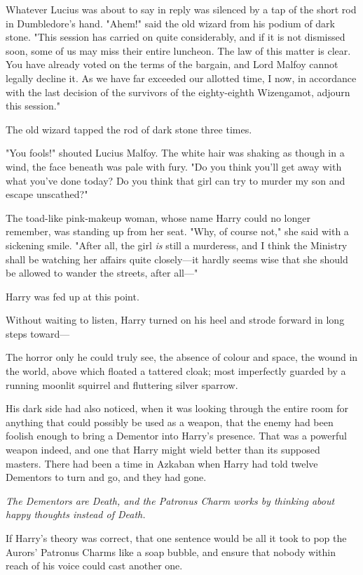 Whatever Lucius was about to say in reply was silenced by a tap of the short
rod in Dumbledore's hand. "Ahem!" said the old wizard from his podium of dark
stone. "This session has carried on quite considerably, and if it is not
dismissed soon, some of us may miss their entire luncheon. The law of this
matter is clear. You have already voted on the terms of the bargain, and Lord
Malfoy cannot legally decline it. As we have far exceeded our allotted time, I
now, in accordance with the last decision of the survivors of the eighty-eighth
Wizengamot, adjourn this session."

The old wizard tapped the rod of dark stone three times.

"You fools!" shouted Lucius Malfoy. The white hair was shaking as though in a
wind, the face beneath was pale with fury. "Do you think you'll get away with
what you've done today? Do you think that girl can try to murder my son and
escape unscathed?"

The toad-like pink-makeup woman, whose name Harry could no longer remember, was
standing up from her seat. "Why, of course not," she said with a sickening
smile. "After all, the girl \emph{is} still a murderess, and I think the
Ministry shall be watching her affairs quite closely—it hardly seems wise
that she should be allowed to wander the streets, after all—"

Harry was fed up at this point.

Without waiting to listen, Harry turned on his heel and strode forward in long
steps toward—

The horror only he could truly see, the absence of colour and space, the wound
in the world, above which floated a tattered cloak; most imperfectly guarded by
a running moonlit squirrel and fluttering silver sparrow.

His dark side had also noticed, when it was looking through the entire room for
anything that could possibly be used as a weapon, that the enemy had been
foolish enough to bring a Dementor into Harry's presence. That was a powerful
weapon indeed, and one that Harry might wield better than its supposed masters.
There had been a time in Azkaban when Harry had told twelve Dementors to turn
and go, and they had gone.

\emph{The Dementors are Death, and the Patronus Charm works by thinking about
happy thoughts instead of Death.}

If Harry's theory was correct, that one sentence would be all it took to pop
the Aurors' Patronus Charms like a soap bubble, and ensure that nobody within
reach of his voice could cast another one.

